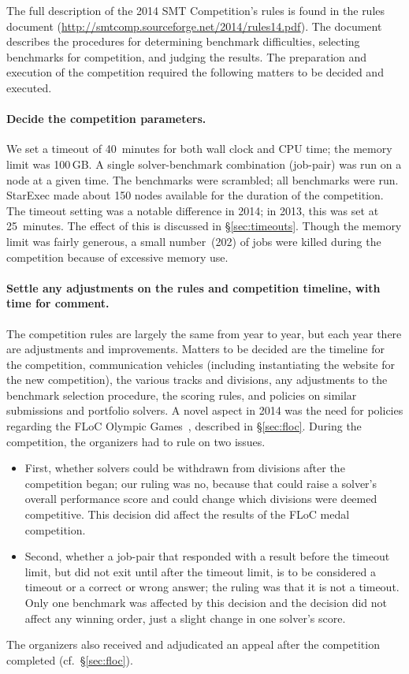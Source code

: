 \documentclass[twoside,11pt]{article}
\begin{document}
The full description of the 2014 SMT Competition's rules is found in the rules document (\url{http://smtcomp.sourceforge.net/2014/rules14.pdf}). The document describes the procedures for determining benchmark difficulties, selecting benchmarks for competition, and judging the results. The preparation and execution of the competition required the following matters to be decided and executed.

\paragraph{Decide the competition parameters.} We set a timeout of 40~minutes for both wall clock and CPU time; the memory limit was 100\,GB. A single solver-benchmark combination (job-pair) was run on a node at a given time. The benchmarks were scrambled; all benchmarks were run. StarExec made about 150 nodes available for the duration of the competition. The timeout setting was a notable difference in 2014; in 2013, this was set at 25~minutes. The effect of this is discussed in \S\ref{sec:timeouts}. Though the memory limit was fairly generous, a small number~(202) of jobs were killed during the competition because of excessive memory use.

\paragraph{Settle any adjustments on the rules and competition timeline, with time for comment.} 
The competition rules are largely the same from year to year, but each year there are adjustments and improvements. Matters to be decided are the timeline for the competition, communication vehicles (including instantiating the website for the new competition), the various tracks and divisions, any adjustments to the benchmark selection procedure, the scoring rules, and policies on similar submissions and portfolio solvers. A novel aspect in 2014 was the need for policies regarding the FLoC Olympic Games~\cite{FLoCGames}, described in \S\ref{sec:floc}. During the competition, the organizers had to rule on two issues. 
\begin{itemize}[noitemsep,nolistsep]
\item First, whether solvers could be withdrawn from divisions after the competition began; our ruling was no, because that could raise a solver's overall performance score and could change which divisions were deemed competitive. This decision did affect the results of the FLoC medal competition.
\item Second, whether a job-pair that responded with a result before the timeout limit, but did not exit until after the timeout limit, is to be considered a timeout or a correct or wrong answer; the ruling was that it is not a timeout. Only one benchmark was affected by this decision and the decision did not affect any winning order, just a slight change in one solver's score.
\end{itemize}
The organizers also received and adjudicated an appeal after the competition completed (cf.~\S\ref{sec:floc}).
\end{document}

